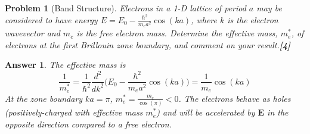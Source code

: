 \documentclass[a4paper]{article}
\newtheorem{ans}{Answer}[subsection]
\theoremstyle{new}
\newtheorem{qns}{Problem}[subsection]
\begin{document}
\begin{qns}[Band Structure]
Electrons in a 1-D lattice of period $a$ may be considered to have energy $E=E_0-\frac{\hbar^2}{m_ea^2}\cos(ka)$, where $k$ is the electron wavevector and $m_e$ is the free electron mass. Determine the effective mass, $m_e^*$, of electrons at the first Brillouin zone boundary, and comment on your result.\hfill\textbf{[4]}

\begin{mdframed}
\end{mdframed}
\end{qns}
\begin{ans}
The effective mass is
$$\frac{1}{m_e^*}=\frac{1}{\hbar^2}\frac{d^2}{dk^2}\bigg(E_0-\frac{\hbar^2}{m_ea^2}\cos(ka)\bigg)=\frac{1}{m_e}\cos(ka)$$
At the zone boundary $ka=\pi$, $m_e^*=\frac{m_e}{\cos(\pi)}<0$. The electrons behave as holes (positively-charged with effective mass $m_e^*$) and will be accelerated by $\mathbf{E}$ in the opposite direction compared to a free electron.
\end{ans}
\newpage
\end{document}
